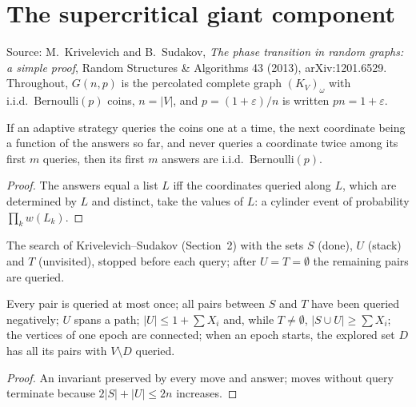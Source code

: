 \section{The supercritical giant component}\label{sec:krivelevich-sudakov}
Source: M.~Krivelevich and B.~Sudakov, \emph{The phase transition in random graphs: a simple
proof}, Random Structures \& Algorithms 43 (2013), arXiv:1201.6529. Throughout, $G(n,p)$ is the
percolated complete graph $(K_V)_\omega$ with i.i.d.\ Bernoulli$(p)$ coins, $n=|V|$, and
$p=(1+\varepsilon)/n$ is written $pn=1+\varepsilon$.

\begin{lemma}\label{lem:deferred}
\leanok
If an adaptive strategy queries the coins one at a time, the next coordinate being a function of
the answers so far, and never queries a coordinate twice among its first $m$ queries, then its
first $m$ answers are i.i.d.\ Bernoulli$(p)$.
\end{lemma}
\begin{proof}\leanok
The answers equal a list $L$ iff the coordinates queried along $L$, which are determined by $L$
and distinct, take the values of $L$: a cylinder event of probability $\prod_k w(L_k)$.
\end{proof}

\begin{definition}\label{def:dfs}
\leanok
The search of Krivelevich--Sudakov (Section~2) with the sets $S$ (done), $U$ (stack) and $T$
(unvisited), stopped before each query; after $U=T=\emptyset$ the remaining pairs are queried.
\end{definition}

\begin{lemma}\label{lem:dfs}
\leanok{}
Every pair is queried at most once; all pairs between $S$ and $T$ have been queried negatively;
$U$ spans a path; $|U|\le 1+\sum X_i$ and, while $T\ne\emptyset$, $|S\cup U|\ge\sum X_i$; the
vertices of one epoch are connected; when an epoch starts, the explored set $D$ has all its pairs
with $V\setminus D$ queried.
\end{lemma}
\begin{proof}\leanok
An invariant preserved by every move and answer; moves without query terminate because
$2|S|+|U|\le 2n$ increases.
\end{proof}

